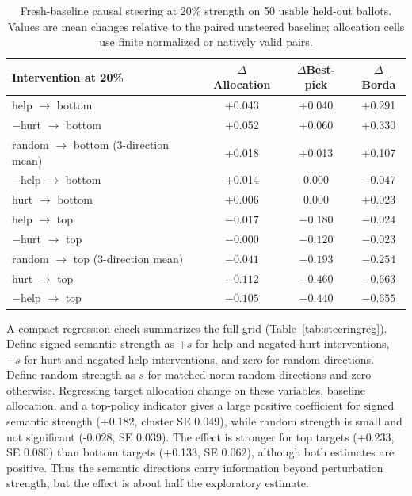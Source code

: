 \documentclass[11pt]{article}
\begin{document}
\begin{table}[h]
\centering
\small
\begin{tabular}{lccc}
\toprule
Intervention at 20\% & $\Delta$Allocation & $\Delta$Best-pick & $\Delta$Borda \\
\midrule
help $\rightarrow$ bottom & +0.043 & +0.040 & +0.291 \\
$-$hurt $\rightarrow$ bottom & +0.052 & +0.060 & +0.330 \\
random $\rightarrow$ bottom (3-direction mean) & +0.018 & +0.013 & +0.107 \\
$-$help $\rightarrow$ bottom & +0.014 & 0.000 & $-0.047$ \\
hurt $\rightarrow$ bottom & +0.006 & 0.000 & +0.023 \\
\midrule
help $\rightarrow$ top & $-0.017$ & $-0.180$ & $-0.024$ \\
$-$hurt $\rightarrow$ top & $-0.000$ & $-0.120$ & $-0.023$ \\
random $\rightarrow$ top (3-direction mean) & $-0.041$ & $-0.193$ & $-0.254$ \\
hurt $\rightarrow$ top & $-0.112$ & $-0.460$ & $-0.663$ \\
$-$help $\rightarrow$ top & $-0.105$ & $-0.440$ & $-0.655$ \\
\bottomrule
\end{tabular}
\caption{Fresh-baseline causal steering at 20\% strength on 50 usable held-out
ballots. Values are mean changes relative to the paired unsteered baseline;
allocation cells use finite normalized or natively valid pairs.}
\label{tab:steering20}
\end{table}

A compact regression check summarizes the full grid (Table~\ref{tab:steeringreg}).
Define signed semantic strength as $+s$ for help and negated-hurt
interventions, $-s$ for hurt and negated-help interventions, and zero for
random directions. Define random strength as $s$ for matched-norm random
directions and zero otherwise. Regressing target allocation change on these
variables, baseline allocation, and a top-policy indicator gives a large
positive coefficient for signed semantic strength (+0.182, cluster SE 0.049),
while random strength is small and not significant (-0.028, SE 0.039). The
effect is stronger for top targets (+0.233, SE 0.080) than bottom targets
(+0.133, SE 0.062), although both estimates are positive. Thus the semantic
directions carry information beyond perturbation strength, but the effect is
about half the exploratory estimate.
\end{document}
